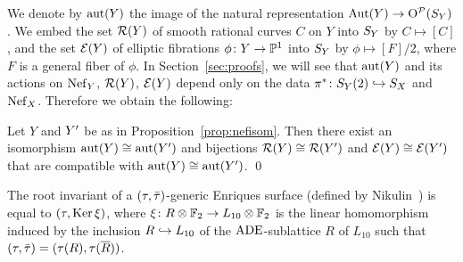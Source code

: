 \documentclass{amsart}
\numberwithin{procedure}{section}
\begin{document}
%
We denote by $\aut(Y)$ the image of the natural representation
$\Aut(Y) \to \OGP(\SY)$.
We embed the set $\Rats(Y)$ 
of smooth rational curves $C$ on $Y$ into $\SY$ by $C\mapsto [C]$,
and the set  $\Ells(Y)$ 
of elliptic fibrations $\phi\colon Y\to \P^1$ into $\SY$ by $\phi\mapsto [F]/2$,
where $F$ is a general fiber of $\phi$.
In Section~\ref{sec:proofs}, we will see that 
$\aut(Y)$ and its actions on $\NefY$, $\Rats(Y)$, $\Ells(Y)$
depend only on the  data 
$\pi^* \colon \SY(2)\inj \SX$ and 
$\NefX$.
Therefore we obtain the following: 
%
\begin{corollary}\label{cor:nefisom}
Let $Y$ and $Y\sprime$ be 
as in Proposition~\ref{prop:nefisom}.
Then there exist an isomorphism $\aut(Y)\cong \aut(Y\sprime)$
and  bijections $\Rats(Y)\cong \Rats(Y\sprime)$ and $\Ells(Y)\cong \Ells(Y\sprime)$
that are compatible with $\aut(Y)\cong \aut(Y\sprime)$.
\qed
\end{corollary}
%
\begin{remark}
The root invariant of a $(\tau, \taubar)$-generic Enriques surface
(defined by Nikulin~\cite{Nikulin1984})
is equal to $(\tau, \Ker \xi)$, where $\xi\colon R\tensor  \F_2\to L_{10}\tensor \F_2$
is the linear homomorphism induced by the inclusion $R\inj L_{10}$
of  the $\ADE$-sublattice $R$ of $L_{10}$ such that $(\tau, \taubar)=(\tau(R), \tau(\Rbar))$.
\end{remark}
%
\end{document}

